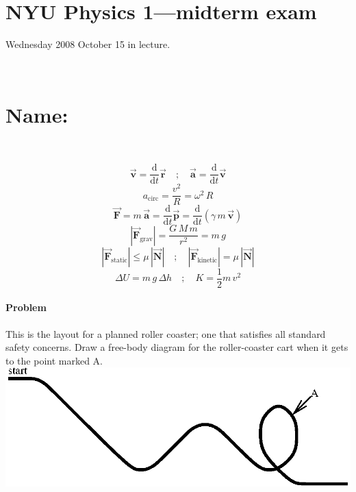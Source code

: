 \documentclass[12pt]{article}
\newcommand{\tv}[1]{\mathbf{\vec{#1}}}
\newcommand{\dd}{\mathrm{d}}
\newcounter{problem}
\begin{document}
\section*{NYU Physics 1---midterm exam}

Wednesday 2008 October 15 in lecture.

~ \vfill ~

\section*{Name:}

~ \vfill ~

\begin{equation}
\tv{v} = \frac{\dd}{\dd t}\tv{r}
\quad ; \quad
\tv{a} = \frac{\dd}{\dd t}\tv{v}
\end{equation}
\begin{equation}
a_{\mathrm{circ}} = \frac{v^2}{R} = \omega^2\,R
\end{equation}
\begin{equation}
\tv{F} = m\,\tv{a}
       = \frac{\dd}{\dd t}\tv{p}
       = \frac{\dd}{\dd t}(\gamma\,m\,\tv{v})
\end{equation}
\begin{equation}
|\tv{F}_{\mathrm{grav}}| = \frac{G\,M\,m}{r^2} = m\,g
\end{equation}
\begin{equation}
|\tv{F}_{\mathrm{static}}| \leq \mu\,|\tv{N}|
\quad ; \quad
|\tv{F}_{\mathrm{kinetic}}| = \mu\,|\tv{N}|
\end{equation}
\begin{equation}
\Delta U = m\,g\,\Delta h
\quad ; \quad
K = \frac{1}{2} m\,v^2
\end{equation}

\clearpage

\paragraph{Problem~\theproblem}%
This is the layout for a planned roller coaster; one that satisfies
all standard safety concerns.  Draw a free-body diagram for the
roller-coaster cart when it gets to the point marked A.\\
\includegraphics{../eps/roller_coaster.eps}
\end{document}
